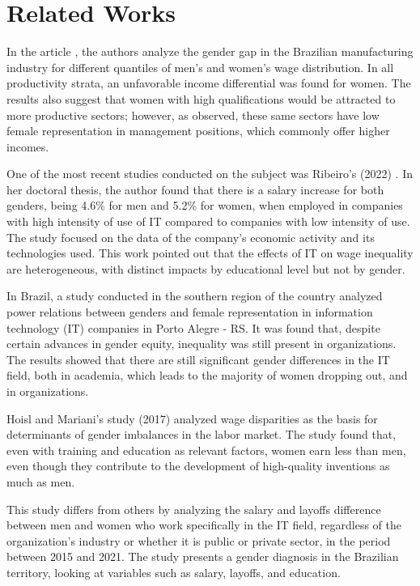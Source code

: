 \section{Related Works}

In the article \cite{de2021evidencias}, the authors analyze the gender gap in the Brazilian manufacturing industry for different quantiles of men's and women's wage distribution. In all productivity strata, an unfavorable income differential was found for women.
The results also suggest that women with high qualifications would be attracted to more productive sectors; however, as observed, these same sectors have low female representation in management positions, which commonly offer higher incomes.

One of the most recent studies conducted on the subject was Ribeiro's (2022) \cite{ribeiro2022efeitos}. In her doctoral thesis, the author found that there is a salary increase for both genders, being 4.6\% for men and 5.2\% for women, when employed in companies with high intensity of use of IT compared to companies with low intensity of use. The study focused on the data of the company's economic activity and its technologies used. This work pointed out that the effects of IT on wage inequality are heterogeneous, with distinct impacts by educational level but not by gender.

In Brazil, a study conducted in the southern region of the country \cite{camargo2019relaccoes} analyzed power relations between genders and female representation in information technology (IT) companies in Porto Alegre - RS. It was found that, despite certain advances in gender equity, inequality was still present in organizations. The results showed that there are still significant gender differences in the IT field, both in academia, which leads to the majority of women dropping out, and in organizations.

Hoisl and Mariani's study (2017) \cite{hoisl2017sa} analyzed wage disparities as the basis for determinants of gender imbalances in the labor market. The study found that, even with training and education as relevant factors, women earn less than men, even though they contribute to the development of high-quality inventions as much as men.

This study differs from others by analyzing the salary and layoffs difference between men and women who work specifically in the IT field, regardless of the organization's industry or whether it is public or private sector, in the period between 2015 and 2021. The study presents a gender diagnosis in the Brazilian territory, looking at variables such as salary, layoffs, and education.

